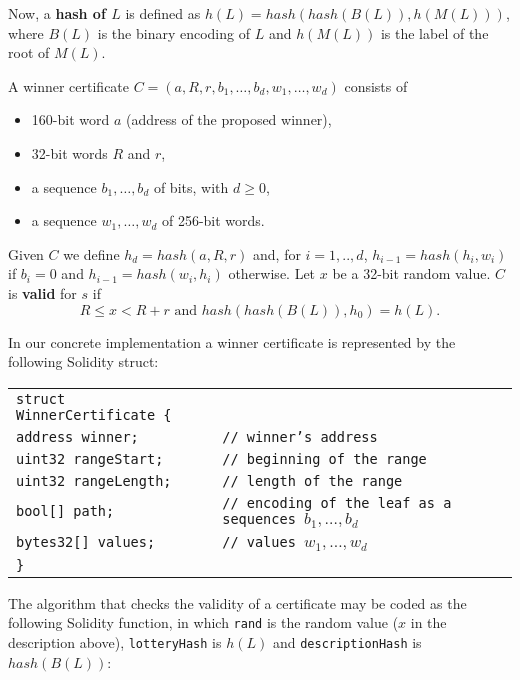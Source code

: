 \documentclass[a4paper]{article}
\begin{document}
    Now, a \textbf{hash of $L$} is defined as $h(L) = hash(hash(B(L)), h(M(L)))$, where $B(L)$ is the binary encoding of $L$
    and $h(M(L))$ is the label of the root of $M(L)$.

    A winner certificate $C = (a, R, r, b_1, \ldots, b_d, w_1, \ldots, w_d)$ consists of
    \begin{itemize}
        \item 160-bit word $a$ (address of the proposed winner),
        \item 32-bit words $R$ and $r$,
        \item a sequence $b_1, \ldots, b_d$ of bits, with $d \geq 0$,
        \item a sequence $w_1, \ldots, w_d$ of 256-bit words.
    \end{itemize}

    Given $C$ we define $h_d = hash(a, R, r)$ and, for $i = 1, .., d$, $h_{i-1} = hash(h_i, w_i)$ if $b_i = 0$ and
    $h_{i-1} = hash(w_i, h_i)$ otherwise.
    Let $x$ be a 32-bit random value. $C$ is \textbf{valid} for $s$ if
    \begin{displaymath}
        R \leq x < R + r  \text{ and } hash(hash(B(L)), h_0) = h(L).
    \end{displaymath}

    In our concrete implementation a winner certificate is represented by the following Solidity struct:

    \begin{center}
        \begin{tabular}{ll}
            \texttt{struct WinnerCertificate \{} &  \\
		    \qquad \texttt{address winner;} &  \texttt{// winner's address}\\
		    \qquad \texttt{uint32 rangeStart;} & \texttt{// beginning of the range}\\
		    \qquad \texttt{uint32 rangeLength;} & \texttt{// length of the range}\\
		    \qquad \texttt{bool[] path;} & \texttt{// encoding of the leaf as a sequences $b_1, \ldots, b_d$}\\
		    \qquad \texttt{bytes32[] values;} & \texttt{// values $w_1, \ldots, w_d$}\\
    		\texttt{\}}
        \end{tabular}
    \end{center}

    The algorithm that checks the validity of a certificate may be coded as the following Solidity function,
    in which \texttt{rand} is the random value ($x$ in the description above), \texttt{lotteryHash} is $h(L)$
    and \texttt{descriptionHash} is $hash(B(L))$:
\end{document}
